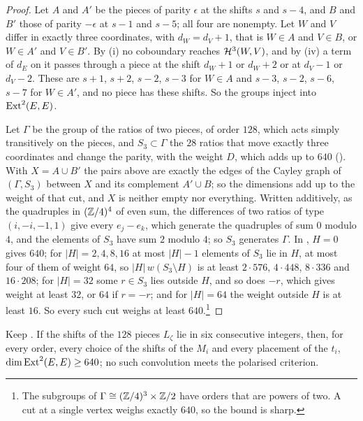 \begin{proof}
Let $A$ and $A'$ be the pieces of parity $\epsilon$ at the shifts $s$ and
$s-4$, and $B$ and $B'$ those of parity $-\epsilon$ at $s-1$ and $s-5$; all
four are nonempty. Let $W$ and $V$ differ in exactly three coordinates, with
$d_{W}=d_{V}+1$, that is $W\in A$ and $V\in B$, or $W\in A'$ and $V\in B'$.
By (i) no coboundary reaches $\mathcal{H}^{3}(W,V)$, and by
(iv) a term of $d_{E}$ on it passes through a piece at
the shift $d_{W}+1$ or $d_{W}+2$ or at $d_{V}-1$ or $d_{V}-2$. These are
$s+1$, $s+2$, $s-2$, $s-3$ for $W\in A$ and $s-3$, $s-2$, $s-6$, $s-7$ for
$W\in A'$, and no piece has these shifts. So the groups inject into
$\operatorname{Ext}^{2}(E,E)$.

Let $\Gamma$ be the group of the ratios of two pieces, of order $128$,
which acts simply transitively on the pieces, and $S_{3}\subset\Gamma$ the
$28$ ratios that move exactly three coordinates and change the parity, with
the weight $D$, which adds up to $640$ (). With
$X=A\cup B'$ the pairs above are exactly the edges of the Cayley graph of
$(\Gamma,S_{3})$ between $X$ and its complement $A'\cup B$; so the
dimensions add up to the weight of that cut, and $X$ is neither empty nor
everything. Written additively, as the quadruples in $(\mathbb{Z}/4)^{4}$ of even
sum, the differences of two ratios of type $(i,-i,-1,1)$ give every
$e_{j}-e_{k}$, which generate the quadruples of sum $0$ modulo $4$, and the
elements of $S_{3}$ have sum $2$ modulo $4$; so $S_{3}$ generates $\Gamma$.
In ,
$H=0$ gives $640$; for $|H|=2,4,8,16$ at most $|H|-1$ elements of $S_{3}$ lie
in $H$, at most four of them of weight $64$, so $|H|\,w(S_{3}\setminus H)$ is
at least $2\cdot576$, $4\cdot448$, $8\cdot336$ and $16\cdot208$; for
$|H|=32$ some $r\in S_{3}$ lies outside $H$, and so does $-r$, which gives
weight at least $32$, or $64$ if $r=-r$; and for $|H|=64$ the weight outside
$H$ is at least $16$. So every such cut weighs at least $640$.\footnote{The
subgroups of $\Gamma\cong(\mathbb{Z}/4)^{3}\times\mathbb{Z}/2$ have orders that are powers
of two. A cut at a single vertex weighs exactly $640$, so the bound is
sharp.}
\end{proof}

\begin{corollary}\label{cor:efoursix}
Keep . If the shifts of the $128$ pieces $L_{\zeta}$
lie in six consecutive integers, then, for every order, every choice of the
shifts of the $M_{i}$ and every placement of the $t_{i}$,
$\dim\operatorname{Ext}^{2}(E,E)\ge640$; no such convolution meets the polarised
criterion.
\end{corollary}

